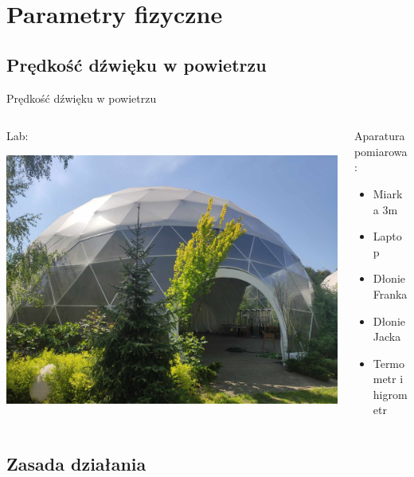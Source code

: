 \documentclass{beamer}
\begin{document}
\section{Parametry fizyczne}

\subsection{Prędkość dźwięku w powietrzu}

\begin{frame}{Prędkość dźwięku w powietrzu}

	\begin{columns}
		\begin{column}{0.5\textwidth}
			Lab:

			\includegraphics[width=\linewidth]{lab_KlaKop.jpg}
		\end{column}
		\begin{column}{0.5\textwidth}
			Aparatura pomiarowa:
			\begin{itemize}
				\item Miarka 3m
				\item Laptop
				\item Dłonie Franka
				\item Dłonie Jacka
				\item Termometr i higrometr
			\end{itemize}
		\end{column}
	\end{columns}

\end{frame}

\subsection{Zasada działania}
\end{document}
